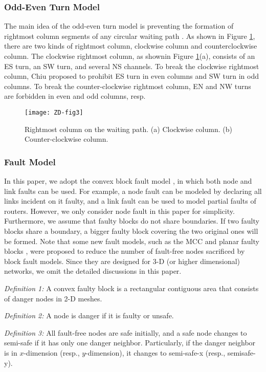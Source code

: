 \subsubsection{Odd-Even Turn Model}
The main idea of the odd-even turn model is preventing the formation of rightmost column segments of any circular waiting path \cite{chiu2000odd}. As shown in Figure \ref{fig:ZD-fig3}, there are two kinds of rightmost column, clockwise column and counterclockwise column. The clockwise rightmost column, as shownin Figure \ref{fig:ZD-fig3}(a), consists of an ES turn, an SW turn, and several NS channels. To break the clockwise rightmost column, Chiu \cite{chiu2000odd} proposed to prohibit ES turn in even columns and SW turn in odd columns. To break the counter-clockwise rightmost column, EN and NW turns are forbidden in even and odd columns, resp.

\begin{figure}[h]
    \centering
        \texttt{[image: ZD-fig3]}
          \caption{Rightmost column on the waiting path. (a) Clockwise column. (b) Counter-clockwise column.}
        \label{fig:ZD-fig3}
\end{figure}

\subsubsection{Fault Model}
In this paper, we adopt the convex block fault model \cite{boppana1994fault}, in which both node and link faults can be used. For example, a node fault can be modeled by declaring all links incident on it faulty, and a link fault can be used to model partial faults of routers. However, we only consider node fault in this paper for simplicity. Furthermore, we assume that faulty blocks do not share boundaries. If two faulty blocks share a boundary, a bigger faulty block covering the two original ones will be formed. Note that some new fault models, such as the MCC \cite{boppana1994fault} and planar faulty blocks \cite{jiang2008new}, were proposed to reduce the number of fault-free nodes sacrificed by block fault models. Since they are designed for 3-D (or higher dimensional) networks, we omit the detailed discussions in this paper.

\textit{Definition 1:} A convex faulty block is a rectangular contiguous area that consists of danger nodes in 2-D meshes.

\textit{Definition 2:} A node is danger if it is faulty or unsafe.

\textit{Definition 3:} All fault-free nodes are safe initially, and a safe node changes to semi-safe if it has only one danger neighbor. Particularly, if the danger neighbor is in $x$-dimension (resp., $y$-dimension), it changes to semi-safe-x (resp., semisafe-y).

